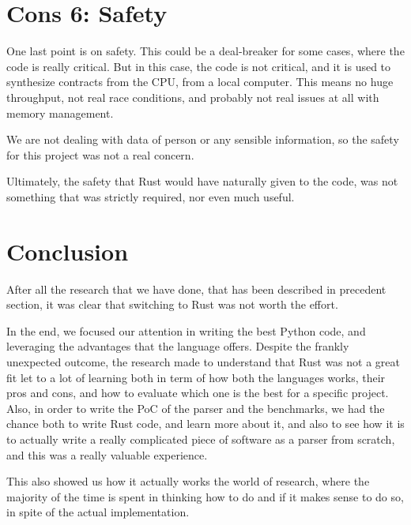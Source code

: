 \section[Safety]{Cons 6: Safety}
One last point is on safety. This could be a deal-breaker for some cases, where
the code is really critical. But in this case, the code is not critical, and it is
used to synthesize contracts from the CPU, from a local computer. This means no huge
throughput, not real race conditions, and probably not real issues at all with memory
management.

We are not dealing with data of person or any sensible information, so the
safety for this project was not a real concern.

Ultimately, the safety that Rust would have naturally given to the code, was not
something that was strictly required, nor even much useful.

\section[Conclusion]{Conclusion}
After all the research that we have done, that has been described in precedent
section, it was clear that switching to Rust was not worth the effort.

In the end, we focused our attention in writing the best Python code, and leveraging
the advantages that the language offers. Despite the frankly unexpected outcome,
the research made to understand that Rust was not a great fit let to a lot of learning
both in term of how both the languages works, their pros and cons, and how to evaluate
which one is the best for a specific project. Also, in order to write the PoC of
the parser and the benchmarks, we had the chance both to write Rust code, and learn
more about it, and also to see how it is to actually write a really complicated
piece of software as a parser from scratch, and this was a really valuable experience.

This also showed us how it actually works the world of research, where the
majority of the time is spent in thinking how to do and if it makes sense to do
so, in spite of the actual implementation.